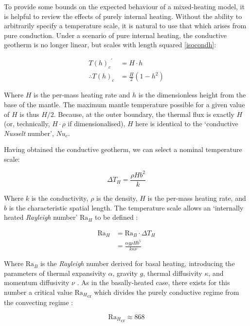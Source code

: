 To provide some bounds on the expected behaviour of a mixed-heating model, it is helpful to review the effects of purely internal heating. Without the ability to arbitrarily specify a temperature scale, it is natural to use that which arises from pure conduction. Under a scenario of pure internal heating, the conductive geotherm is no longer linear, but scales with length squared \cite{Turcotte2014-by} \ref{isocondh}:

\begin{align*}
{{T(h)}_{c}}^{'} &= H\cdot h \\
\therefore {T(h)}_{c} &= \frac{H}{2} \left( 1 - h^2 \right)
\end{align*}

Where $H$ is the per-mass heating rate and $h$ is the dimensionless height from the base of the mantle. The maximum mantle temperature possible for a given value of $H$ is thus $H/2$. Because, at the outer boundary, the thermal flux is exactly $H$ (or, technically, $H \cdot \rho$ if dimensionalised), $H$ here is identical to the `conductive \textit{Nusselt} number', ${Nu}_{c}$.

Having obtained the conductive geotherm, we can select a nominal temperature scale:

\begin{equation}
{\Delta T}_H = \frac{\rho H b^2}{k}
\end{equation}

Where $k$ is the conductivity, $\rho$ is the density, $H$ is the per-mass heating rate, and $b$ is the characteristic spatial length. The temperature scale allows an `internally heated \textit{Rayleigh} number' ${\mathrm{Ra}}_H$ to be defined \cite{Roberts1967-aq}:

\begin{align*}
{\mathrm{Ra}}_H &= {\mathrm{Ra}}_B \cdot {\Delta T}_H \\
&= \frac{\alpha g \rho H b^5}{k \kappa \nu}
\end{align*}

Where ${\mathrm{Ra}}_B$ is the \textit{Rayleigh} number derived for basal heating, introducing the parameters of thermal expansivity $\alpha$, gravity $g$, thermal diffusivity $\kappa$, and momentum diffusivity $\nu$ \cite{Turcotte2014-by}. As in the basally-heated case, there exists for this number a critical value ${{\mathrm{Ra}}_{H}}_{\mathrm{cr}}$ which divides the purely conductive regime from the convecting regime \cite{Roberts1967-aq}:

\begin{equation}
{{\mathrm{Ra}}_{H}}_{\mathrm{cr}} \approx 868
\end{equation}

